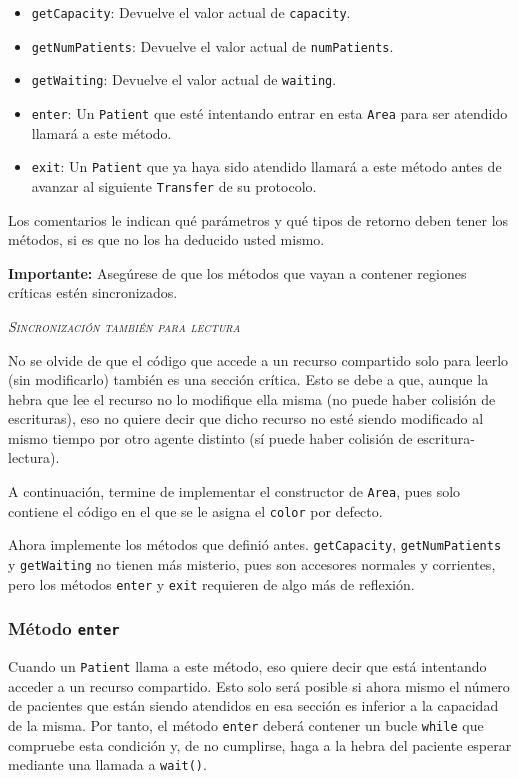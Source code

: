 \documentclass[10pt,a4paper,spanish]{article}
\newcommand{\sombreado}[2]{
  \begin{shaded}
    \begin{center} \emph{\textsc{#1}} \end{center}
    \noindent #2\\
  \end{shaded}
}
\newcommand{\code}[1]{\texttt{#1}}
\begin{document}
\begin{itemize}
    \item \code{getCapacity}: Devuelve el valor actual de \code{capacity}.
    \item \code{getNumPatients}: Devuelve el valor actual de \code{numPatients}.
    \item \code{getWaiting}: Devuelve el valor actual de \code{waiting}.
    \item \code{enter}: Un \code{Patient} que esté intentando entrar en esta \code{Area} para ser atendido llamará a este método.
    \item \code{exit}: Un \code{Patient} que ya haya sido atendido llamará a este método antes de avanzar al siguiente \code{Transfer} de su protocolo.
\end{itemize}

Los comentarios le indican qué parámetros y qué tipos de retorno deben tener los métodos, si es que no los ha deducido usted mismo.

\textbf{Importante:} Asegúrese de que los métodos que vayan a contener regiones críticas estén sincronizados.

\sombreado{Sincronización también para lectura}{No se olvide de que el código que accede a un recurso compartido solo para leerlo (sin modificarlo) también es una sección crítica. Esto se debe a que, aunque la hebra que lee el recurso no lo modifique ella misma (no puede haber colisión de escrituras), eso no quiere decir que dicho recurso no esté siendo modificado al mismo tiempo por otro agente distinto (sí puede haber colisión de escritura-lectura).}

A continuación, termine de implementar el constructor de \code{Area}, pues solo contiene el código en el que se le asigna el \code{color} por defecto.

Ahora implemente los métodos que definió antes. \code{getCapacity}, \code{getNumPatients} y \code{getWaiting} no tienen más misterio, pues son accesores normales y corrientes, pero los métodos \code{enter} y \code{exit} requieren de algo más de reflexión.

\subsubsection{Método \code{enter}}

Cuando un \code{Patient} llama a este método, eso quiere decir que está intentando acceder a un recurso compartido. Esto solo será posible si ahora mismo el número de pacientes que están siendo atendidos en esa sección es inferior a la capacidad de la misma. Por tanto, el método \code{enter} deberá contener un bucle \code{while} que compruebe esta condición y, de no cumplirse, haga a la hebra del paciente esperar mediante una llamada a \code{wait()}.
\end{document}
